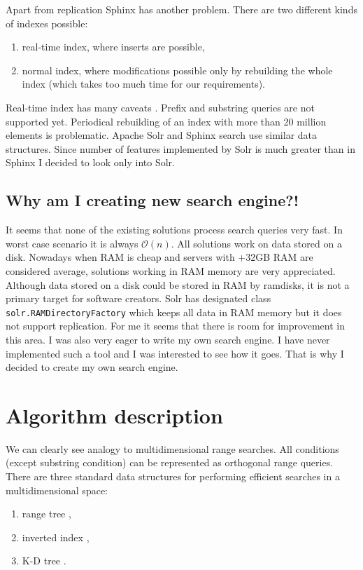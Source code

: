 \documentclass[10pt,a4paper]{article}
\newcommand{\Oh}{\mathcal{O}}
\begin{document}
Apart from replication Sphinx has another problem. There are two different kinds of indexes possible:
\begin{enumerate}
\item real-time index, where inserts are possible,
\item normal index, where modifications possible only by rebuilding the whole index (which takes too much time for our requirements).
\end{enumerate}

Real-time index has many caveats \cite{SPHINXCAV}. Prefix and substring queries are not supported yet. Periodical rebuilding of an index with more than 20 million elements is problematic. Apache Solr and Sphinx search use similar data structures. Since number of features implemented by Solr is much greater than in Sphinx I decided to look only into Solr. 

\subsection{Why am I creating new search engine?!}
It seems that none of the existing solutions process search queries very fast. In worst case scenario it is always $\Oh(n)$. All solutions work on data stored on a disk. Nowadays when RAM is cheap and servers with +32GB RAM are considered average, solutions working in RAM memory are very appreciated. Although data stored on a disk could be stored in RAM by ramdisks, it is not a primary target for software creators. Solr has designated class \verb|solr.RAMDirectoryFactory| which keeps all data in RAM memory but it does not support replication. For me it seems that there is room for improvement in this area. I was also very eager to write my own search engine. I have never implemented such a tool and I was interested to see how it goes. That is why I decided to create my own search engine.  

\section{Algorithm description}
\label{chapter:algorithm}
We can clearly see analogy to multidimensional range searches. All conditions (except substring condition) can be represented as orthogonal range queries. There are three standard data structures for performing efficient searches in a multidimensional space:

\begin{enumerate}
\item range tree \cite{CGAAA},
\item inverted index \cite{INVIND},
\item K-D tree \cite{CGAAA}.
\end{enumerate}
\end{document}
